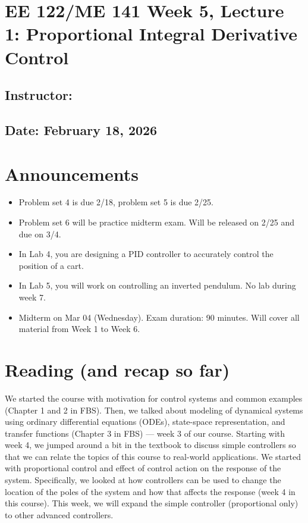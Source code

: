 \documentclass{ee122_notes}
\renewcommand{\releasedate}{February 18, 2026}
\begin{document}
\section*{EE 122/ME 141 Week 5, Lecture 1: Proportional Integral Derivative Control}
\subsection*{Instructor: \instructor}
\subsection*{Date: \releasedate}
\section{Announcements}
\begin{itemize}
    \item Problem set 4 is due 2/18, problem set 5 is due 2/25.
    \item Problem set 6 will be practice midterm exam. Will be released on 2/25 and due on 3/4.
    \item In Lab 4, you are designing a PID controller to accurately control the position of a cart.
    \item In Lab 5, you will work on controlling an inverted pendulum. No lab during week 7.
    \item Midterm on Mar 04 (Wednesday). Exam duration: 90 minutes. Will cover all material from Week 1 to Week 6.
\end{itemize}

\section{Reading (and recap so far)}
We started the course with motivation for control systems and common examples (Chapter 1 and 2 in FBS). Then, we talked about modeling of dynamical systems using ordinary differential equations (ODEs), state-space representation, and transfer functions (Chapter 3 in FBS) --- week 3 of our course. Starting with week 4, we jumped around a bit in the textbook to discuss simple controllers so that we can relate the topics of this course to real-world applications. We started with proportional control and effect of control action on the response of the system. Specifically, we looked at how controllers can be used to change the location of the poles of the system and how that affects the response (week 4 in this course). This week, we will expand the simple controller (proportional only) to other advanced controllers.
\end{document}
